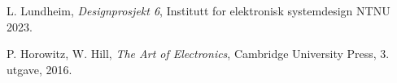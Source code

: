 
  L. Lundheim,
  \emph{Designprosjekt 6},
  Institutt for elektronisk systemdesign NTNU
  2023.

  P. Horowitz, W. Hill,
  \emph{The Art of Electronics},
  Cambridge University Press,
  3. utgave,
  2016.


